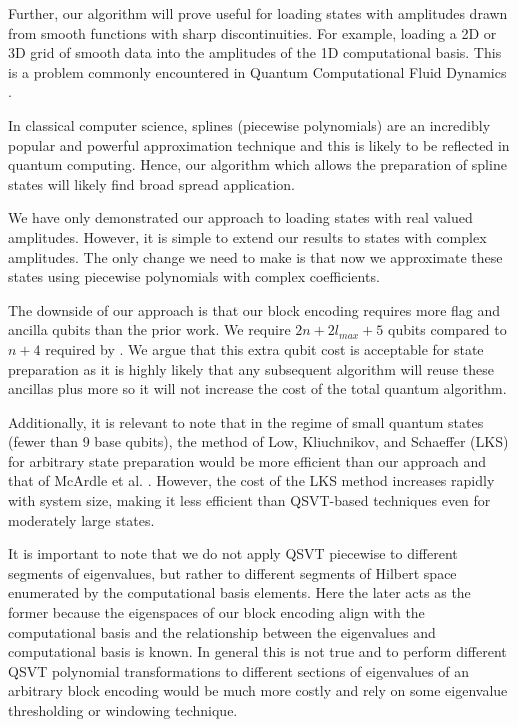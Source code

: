 Further, our algorithm will prove useful for loading states with amplitudes drawn from smooth functions with sharp discontinuities. For example, loading a 2D or 3D grid of smooth data into the amplitudes of the 1D computational basis. This is a problem commonly encountered in Quantum Computational Fluid Dynamics \cite{Lapworth:2022rcw}.

In classical computer science, splines (piecewise polynomials) are an incredibly popular and powerful approximation technique and this is likely to be reflected in quantum computing. Hence, our algorithm which allows the preparation of spline states will likely find broad spread application.

We have only demonstrated our approach to loading states with real valued amplitudes. However, it is simple to extend our results to states with complex amplitudes. The only change we need to make is that now we approximate these states using piecewise polynomials with complex coefficients. 

The downside of our approach is that our block encoding requires more flag and ancilla qubits than the prior work. We require $2n +2l_{max} +5$ qubits compared to $n+4$ required by \cite{mcardleQuantumStatePreparation2022}. We argue that this extra qubit cost is acceptable for state preparation as it is highly likely that any subsequent algorithm will reuse these ancillas plus more so it will not increase the cost of the total quantum algorithm.

Additionally, it is relevant to note that in the regime of small quantum states (fewer than 9 base qubits), the method of Low, Kliuchnikov, and Schaeffer (LKS) for arbitrary state preparation \cite{lowTradingTgatesDirty2018} would be more efficient than our approach and that of McArdle et al. \cite{mcardleQuantumStatePreparation2022}. However, the cost of the LKS method increases rapidly with system size, making it less efficient than QSVT-based techniques even for moderately large states.

It is important to note that we do not apply QSVT piecewise to different segments of eigenvalues, but rather to different segments of Hilbert space enumerated by the computational basis elements. Here the later acts as the former because the eigenspaces of our block encoding align with the computational basis and the relationship between the eigenvalues and computational basis is known. In general this is not true and to perform different QSVT polynomial transformations to different sections of eigenvalues of an arbitrary block encoding would be much more costly and rely on some eigenvalue thresholding or windowing technique.
